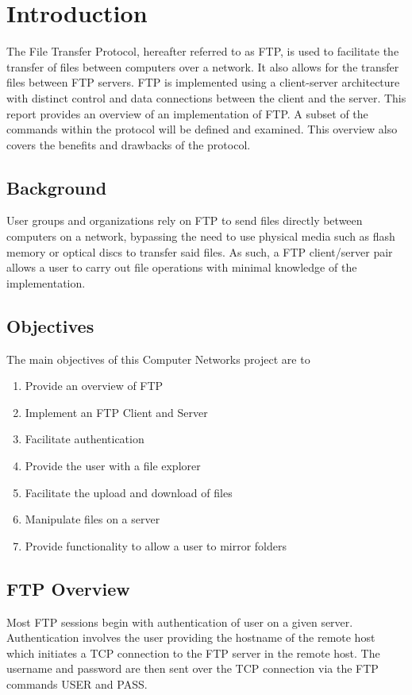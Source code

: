 \chapter{Introduction}
The File Transfer Protocol, hereafter referred to as FTP, is used to
facilitate the transfer of files between computers over a network. It also
allows for the transfer files between FTP servers.
FTP is implemented using a client-server architecture with distinct control
and data connections between the client and the server. This report provides an
overview of an implementation of FTP. A subset of the commands within the protocol
will be defined and examined. This overview also covers the benefits and drawbacks
of the protocol.


\section{Background}
User groups and organizations rely on FTP to send files directly between computers on a network,
bypassing the need to use physical media such as flash memory or optical discs to transfer said files.
As such, a FTP client/server pair allows a user to carry out file operations with minimal knowledge of the implementation.

\newpage

\section{Objectives}
The main objectives of this Computer Networks project are to
\begin{enumerate}
\item Provide an overview of FTP
\item Implement an FTP Client and Server
\item Facilitate authentication
\item Provide the user with a file explorer
\item Facilitate the upload and download of files
\item Manipulate files on a server
\item Provide functionality to allow a user to mirror folders
\end{enumerate}

\section{FTP Overview}
Most FTP sessions begin with authentication of user on a given server. Authentication involves the user providing the hostname of the remote host which initiates a TCP
connection to the FTP server in the remote host. The username and password are then sent over the TCP connection via the FTP commands USER and PASS. \par


